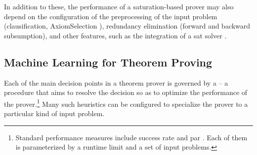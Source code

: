 In addition to these, the performance of a saturation-based prover may also depend on the configuration of the preprocessing of the input problem (clausification, \gls{AxiomSelection} \cite{DBLP:conf/cade/HoderV11,DBLP:conf/cade/KuhlweinLTUH12}), redundancy elimination (forward and backward subsumption), and other features, such as the integration of a \gls{sat} solver \cite{DBLP:conf/cav/Voronkov14}.


\subsection{Machine Learning for Theorem Proving}



Each of the main decision points in a theorem prover is governed by a  -- a procedure that aims to resolve the decision so as to optimize the performance of the prover.\footnote{Standard performance measures include success rate and \gls{par} \cite{DBLP:journals/ai/BischlKKLMFHHLT16}. Each of them is parameterized by a runtime limit and a set of input problems.}
Many such heuristics can be configured to specialize the prover to a particular kind of input problem.

